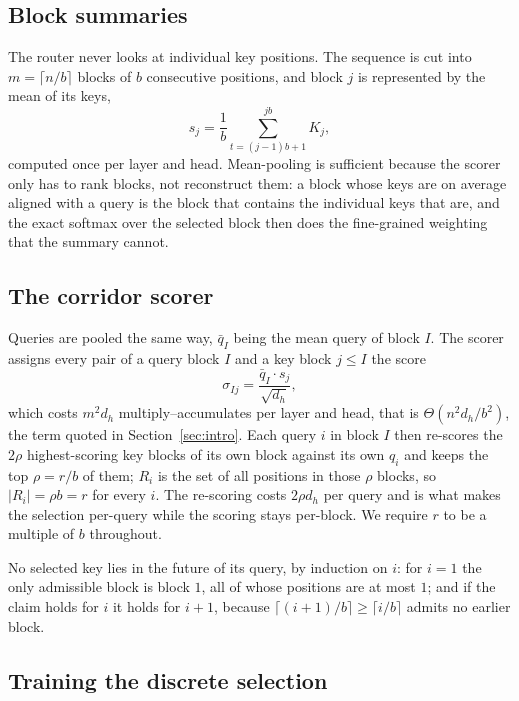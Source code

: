 \documentclass[11pt]{article}
\begin{document}
\subsection{Block summaries}\label{sec:summaries}

The router never looks at individual key positions. The sequence is cut into
$m = \lceil n/b \rceil$ blocks of $b$ consecutive positions, and block $j$ is
represented by the mean of its keys,
\begin{equation}\label{eq:summary}
  s_j = \frac{1}{b} \sum_{t=(j-1)b+1}^{jb} K_j ,
\end{equation}
computed once per layer and head. Mean-pooling is sufficient because the
scorer only has to rank blocks, not reconstruct them: a block whose keys are
on average aligned with a query is the block that contains the individual
keys that are, and the exact softmax over the selected block then does the
fine-grained weighting that the summary cannot.

\subsection{The corridor scorer}\label{sec:scorer}

Queries are pooled the same way, $\bar{q}_I$ being the mean query of block
$I$. The scorer assigns every pair of a query block $I$ and a key block
$j \le I$ the score
\begin{equation}\label{eq:score}
  \sigma_{Ij} = \frac{\bar{q}_I \cdot s_j}{\sqrt{d_h}} ,
\end{equation}
which costs $m^2 d_h$ multiply--accumulates per layer and head, that is
$\Theta(n^2 d_h / b^2)$, the term quoted in Section~\ref{sec:intro}. Each
query $i$ in block $I$ then re-scores the $2\rho$ highest-scoring key blocks
of its own block against its own $q_i$ and keeps the top $\rho = r/b$ of
them; $R_i$ is the set of all positions in those $\rho$ blocks, so
$|R_i| = \rho b = r$ for every $i$. The re-scoring costs $2\rho d_h$ per
query and is what makes the selection per-query while the scoring stays
per-block. We require $r$ to be a multiple of $b$ throughout.

No selected key lies in the future of its query, by induction on $i$: for
$i = 1$ the only admissible block is block $1$, all of whose positions are
at most $1$; and if the claim holds for $i$ it holds for $i + 1$, because
$\lceil (i+1)/b \rceil \ge \lceil i/b \rceil$ admits no earlier block.

\subsection{Training the discrete selection}\label{sec:training}
\end{document}
